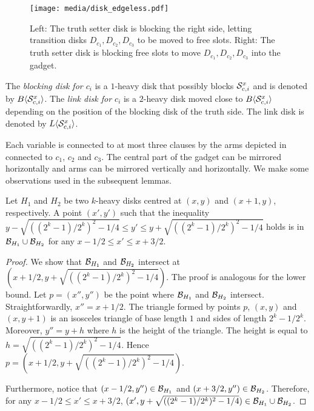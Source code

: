 \begin{toappendix}
\begin{toappendix}
\begin{figure}[!hbt]
    \centering
    \texttt{[image: media/disk\_edgeless.pdf]}
    \caption{Left: The truth setter disk is blocking the right side, letting transition disks $D_{c_1},D_{c_2},D_{c_3}$ to be moved to free slots. Right: The truth setter disk is blocking free slots to move $D_{c_1},D_{c_2},D_{c_3}$ into the gadget.}
    \label{fig:move_of_disks}
\end{figure}

The \emph{blocking disk for $c_i$} is a $1$-heavy disk that possibly blocks $\S_{c,i}^x$ and is denoted by $\bdisk{\S^x_{c,i}}$.
The \emph{link disk for $c_i$} is a $2$-heavy disk moved close to $\bdisk{\S^x_{c,i}}$ depending on the position of the blocking disk of the truth side.
The link disk is denoted by $\ldisk{\S^x_{c,i}}$.

Each variable is connected to at most three clauses by the arms depicted in connected to $c_1$, $c_2$ and $c_3$.
The central part of the gadget can be mirrored horizontally and arms can be mirrored vertically and horizontally.
We make some observations used in the subsequent lemmas.

\begin{observation}\label{obs:vertical_condition}
    Let $H_1$ and $H_2$ be two $k$-heavy disks centred at $(x,y)$ and $(x+1,y)$, respectively. A point $(x',y')$ such that the inequality $y - \sqrt{((2^k-1)/2^k)^2 - 1/4} \le y' \le y + \sqrt{((2^k-1)/2^k)^2 - 1/4}$ holds is in $\B_{H_1} \cup \B_{H_2}$ for any $x-1/2\le x' \le x+3/2 $.
\end{observation}
\begin{proof}
    We show that $\B_{H_1} $ and $ \B_{H_2}$ intersect at $(x+1/2,y + \sqrt{((2^k-1)/2^k)^2 - 1/4})$. 
    The proof is analogous for the lower bound.
    Let $p = (x'',y'')$ be the point where $\B_{H_1} $ and $ \B_{H_2}$ intersect.
    Straightforwardly, $x'' = x+1/2$.
    The triangle formed by points $p$, $(x,y)$ and $(x,y+1)$ is an isosceles triangle of base length $1$ and sides of length $2^k-1 /2^k$.
    Moreover, $y'' = y + h$ where $h$ is the height of the triangle.
    The height is equal to $h = \sqrt{((2^k-1)/2^k)^2 - 1/4}$.
    Hence $p = (x+1/2,y + \sqrt{((2^k-1)/2^k)^2 - 1/4})$.

    Furthermore, notice that $(x-1/2,y'') \in \B_{H_1}$ and $(x+3/2,y'') \in \B_{H_2}$.
    Therefore, for any $x-1/2\le x' \le x+3/2 $, $(x',y + \sqrt{((2^k-1)/2^k)^2 - 1/4}) \in \B_{H_1} \cup \B_{H_2}$.
\end{proof}


\end{toappendix}
\end{toappendix}
